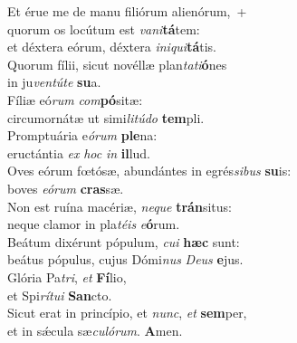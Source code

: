 \evenverse Et érue me de manu filiórum alienórum,~+\\
\evenverse  quorum os locútum est \textit{va}\textit{ni}\textbf{tá}tem:~\*\\
\evenverse et déxtera eórum, déxtera \textit{i}\textit{ni}\textit{qui}\textbf{tá}tis.\\
\oddverse Quorum fílii, sicut novéllæ plan\textit{ta}\textit{ti}\textbf{ó}nes~\*\\
\oddverse in ju\textit{ven}\textit{tú}\textit{te} \textbf{su}a.\\
\evenverse Fíliæ eó\textit{rum} \textit{com}\textbf{pó}sitæ:~\*\\
\evenverse circumornátæ ut simi\textit{li}\textit{tú}\textit{do} \textbf{tem}pli.\\
\oddverse Promptuária e\textit{ó}\textit{rum} \textbf{ple}na:~\*\\
\oddverse eructántia \textit{ex} \textit{hoc} \textit{in} \textbf{il}lud.\\
\evenverse Oves eórum fœtósæ, abundántes in egrés\textit{si}\textit{bus} \textbf{su}is:~\*\\
\evenverse boves \textit{e}\textit{ó}\textit{rum} \textbf{cras}sæ.\\
\oddverse Non est ruína macériæ, \textit{ne}\textit{que} \textbf{trán}situs:~\*\\
\oddverse neque clamor in pla\textit{té}\textit{is} \textit{e}\textbf{ó}rum.\\
\evenverse Beátum dixérunt pópulum, \textit{cu}\textit{i} \textbf{hæc} sunt:~\*\\
\evenverse beátus pópulus, cujus Dómi\textit{nus} \textit{De}\textit{us} \textbf{e}jus.\\
\oddverse Glória Pa\textit{tri}, \textit{et} \textbf{Fí}lio,~\*\\
\oddverse et Spi\textit{rí}\textit{tu}\textit{i} \textbf{San}cto.\\
\evenverse Sicut erat in princípio, et \textit{nunc}, \textit{et} \textbf{sem}per,~\*\\
\evenverse et in sǽcula sæ\textit{cu}\textit{ló}\textit{rum}. \textbf{A}men.\\
